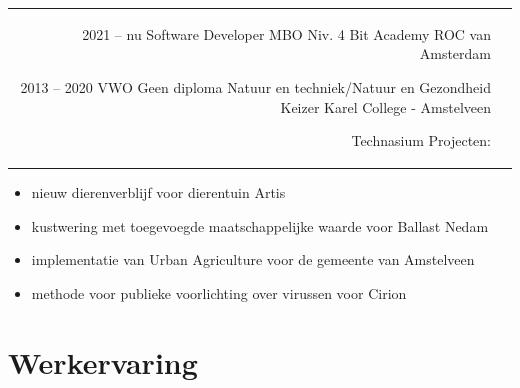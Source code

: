 \documentclass[
	11pt, %
]{FreemanCV}
\begin{document}
\begin{paracol}{2}




	\begin{supertabular}{r l} %

		\qualificationentry
		{2021 -- nu} %
		{Software Developer MBO Niv. 4} %
		{} %
		{Bit Academy} %
		{ROC van Amsterdam} %

		\qualificationentry
		{2013 -- 2020} %
		{VWO} %
		{Geen diploma} %
		{Natuur en techniek/Natuur en Gezondheid} %
		{Keizer Karel College - Amstelveen} %

		\qualificationentry
		{ } %
		{Technasium Projecten:} %
		{} %
		{ } %
		{ } %
	\end{supertabular}

		\vspace{-28pt}
		\small 
		\begin{itemize}
			\item nieuw dierenverblijf voor dierentuin Artis
			\item kustwering met toegevoegde maatschappelijke waarde voor Ballast Nedam
			\item implementatie van Urban Agriculture voor de gemeente van Amstelveen
			\item methode voor publieke voorlichting over virussen voor Cirion
		\end{itemize}
		\normalsize

	\section{Werkervaring}


\end{paracol}
\end{document}
